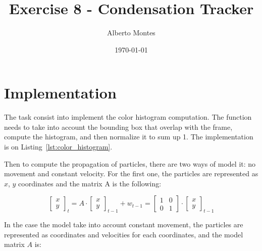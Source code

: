 \documentclass{ethz_report}
\title{Exercise 8 - Condensation Tracker}
\author{Alberto Montes}
\date{\today}
\begin{document}
\maketitle

\section*{Implementation}

The task consist into implement the color histogram computation. The function needs to take into account the bounding box that overlap with the frame, compute the histogram, and then normalize it to sum up 1. The implementation is on Listing~\ref{lst:color_histogram}.



Then to compute the propagation of particles, there are two ways of model it: no movement and constant velocity. For the first one, the particles are represented as $x$, $y$ coordinates and the matrix A is the following:

\begin{equation}
    \begin{bmatrix}
        x \\ y
    \end{bmatrix}_t = A \cdot \begin{bmatrix}
        x \\ y
    \end{bmatrix}_{t-1} + w_{t-1} = \begin{bmatrix}
        1 & 0 \\ 0 & 1
    \end{bmatrix} \cdot \begin{bmatrix}
        x \\ y
    \end{bmatrix}_{t-1}
\end{equation}

In the case the model take into account constant movement, the particles are represented as coordinates and velocities for each coordinates, and the model matrix $A$ is:
\end{document}
